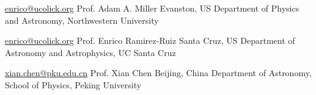 


\begin{cvreferences}
	
\cvreference
	{\href{mailto:amiller@northwestern.edu}{\faEnvelope\acvHeaderIconSep enrico@ucolick.org}} %
	{Prof. Adam A. Miller} %
	{Evanston, US} %
	{Department of Physics and Astronomy, Northwestern University} %


	
\cvreference
	{\href{mailto:enrico@ucolick.org}{\faEnvelope\acvHeaderIconSep enrico@ucolick.org}} %
	{Prof. Enrico Ramirez-Ruiz} %
	{Santa Cruz, US} %
	{Department of Astronomy and Astrophysics, UC Santa Cruz} %


\cvreference
	{\href{mailto:xian.chen@pku.edu.cn}{\faEnvelope\acvHeaderIconSep xian.chen@pku.edu.cn}} %
	{Prof. Xian Chen} %
	{Beijing, China} %
	{Department of Astronomy, School of Physics, Peking University} %
	
	
	




\end{cvreferences}